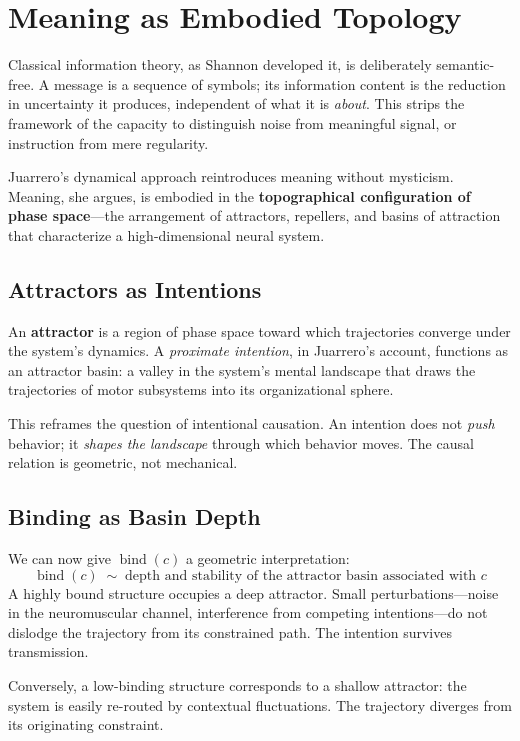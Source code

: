 \documentclass[11pt]{article}
\newcommand{\bind}{\operatorname{bind}}
\begin{document}
\section{Meaning as Embodied Topology}

Classical information theory, as Shannon developed it, is deliberately semantic-free. A
message is a sequence of symbols; its information content is the reduction in uncertainty
it produces, independent of what it is \emph{about}. This strips the framework of the
capacity to distinguish noise from meaningful signal, or instruction from mere regularity.

Juarrero's dynamical approach reintroduces meaning without mysticism. Meaning, she argues,
is embodied in the \textbf{topographical configuration of phase space}—the arrangement of
attractors, repellers, and basins of attraction that characterize a high-dimensional neural
system.

\subsection{Attractors as Intentions}

An \textbf{attractor} is a region of phase space toward which trajectories converge under
the system's dynamics. A \emph{proximate intention}, in Juarrero's account, functions as
an attractor basin: a valley in the system's mental landscape that draws the trajectories
of motor subsystems into its organizational sphere.

This reframes the question of intentional causation. An intention does not \emph{push}
behavior; it \emph{shapes the landscape} through which behavior moves. The causal relation
is geometric, not mechanical.

\subsection{Binding as Basin Depth}

We can now give $\bind(c)$ a geometric interpretation:
\[
\bind(c) \;\sim\; \text{depth and stability of the attractor basin associated with } c
\]
A highly bound structure occupies a deep attractor. Small perturbations—noise in the
neuromuscular channel, interference from competing intentions—do not dislodge the
trajectory from its constrained path. The intention survives transmission.

Conversely, a low-binding structure corresponds to a shallow attractor: the system is
easily re-routed by contextual fluctuations. The trajectory diverges from its originating
constraint.
\end{document}
